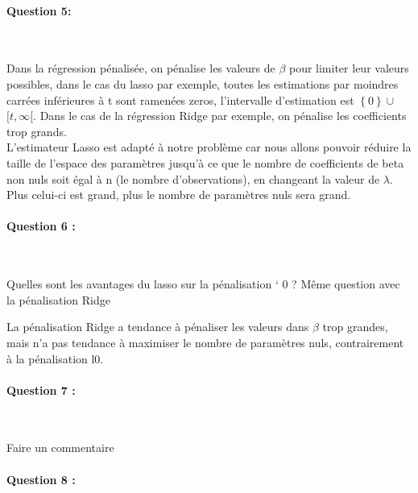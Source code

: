 \documentclass{article}
\begin{document}

\paragraph{Question 5:}
~\par
Dans la régression pénalisée, on pénalise les valeurs de $\beta$ pour limiter leur valeurs possibles, dans le cas du lasso par exemple, toutes les estimations par moindres carrées inférieures à t sont ramenées  zeros, l'intervalle d'estimation est $\left\lbrace0\right\rbrace\cup$$[t,\infty[$. Dans le cas de la régression Ridge par exemple, on pénalise les coefficients trop grands.
\\ L'estimateur Lasso est adapté à notre problème car nous allons pouvoir réduire la taille de l'espace des paramètres jusqu'à ce que le nombre de coefficients de beta non nuls soit égal à n (le nombre d'observations), en changeant la valeur de $\lambda$. Plus celui-ci est grand, plus le nombre de paramètres nuls sera grand.



\paragraph{Question 6 :}
~\par

Quelles sont les avantages du lasso sur la pénalisation ` 0 ?
Même question avec la pénalisation Ridge

La pénalisation Ridge a tendance à pénaliser les valeurs dans $\beta$ trop grandes, mais n'a pas tendance à maximiser le nombre de paramètres nuls, contrairement à la pénalisation l0.

\paragraph{Question 7 :}
~\par
Faire un commentaire

\paragraph{Question 8 :}
~\par
\end{document}
